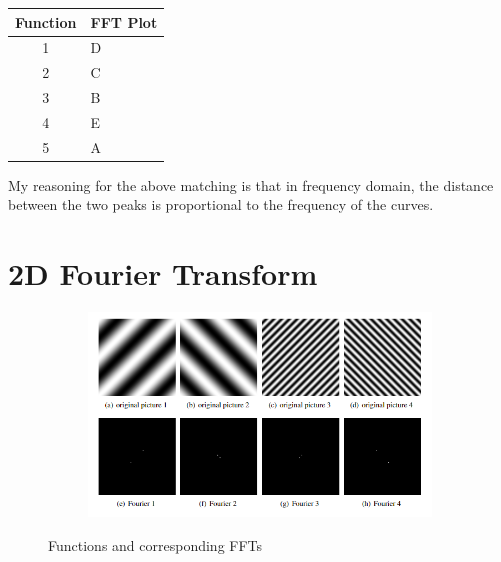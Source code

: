 \documentclass[12pt, oneside]{article}
\begin{document}
\begin{table}[H]
    \centering
    \begin{tabular}{|c|l|}
    \hline
    \multicolumn{1}{|l|}{\textbf{Function}} & \textbf{FFT Plot} \\ \hline
    1                                       & D                 \\ \hline
    2                                       & C                 \\ \hline
    3                                       & B                 \\ \hline
    4                                       & E                 \\ \hline
    5                                       & A                 \\ \hline
    \end{tabular}
\end{table}

My reasoning  for the above matching is that in frequency domain, 
the distance between the two peaks is proportional to the frequency of
the curves.

\section{2D Fourier Transform}


\begin{figure}[H]
    \centering
    \begin{subfigure}[b]{1\textwidth}
        \centering
        \includegraphics[width=\textwidth]{imgs/q6_matching.png}
    \end{subfigure}
    \caption{Functions and corresponding FFTs}
\end{figure}
\end{document}
